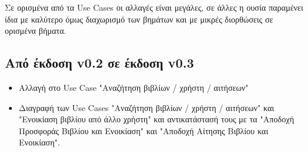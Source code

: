\documentclass[12pt,a4paper]{article}
\begin{document}
Σε ορισμένα από τα Use Cases οι αλλαγές είναι μεγάλες, σε άλλες η ουσία παραμένει ίδια με καλύτερο όμως διαχωρισμό των βημάτων και με μικρές διορθώσεις σε ορισμένα βήματα.

\subsection{Από έκδοση v0.2 σε έκδοση v0.3}
\begin{itemize}
    \item Αλλαγή στο Use Case "Αναζήτηση βιβλίων / χρήστη / αιτήσεων"
    \item Διαγραφή των Use Cases "Αναζήτηση βιβλίων / χρήστη / αιτήσεων" και "Ενοικίαση βιβλίου από άλλο χρήστη" και αντικατάστασή τους με τα "Αποδοχή Προσφοράς Βιβλίου και Ενοικίαση" και "Αποδοχή Αίτησης Βιβλίου και Ενοικίαση".
\end{itemize}
\end{document}
